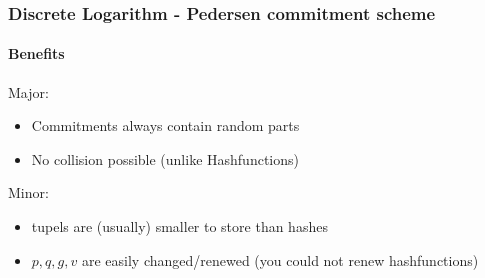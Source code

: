 \begin{frame}
	\frametitle{Discrete Logarithm - Pedersen commitment scheme}
	\framesubtitle{Benefits}
	Major:
	\begin{itemize}
		\item Commitments always contain random parts
		\item No collision possible (unlike Hashfunctions)	
	\end{itemize}
	Minor:
	\begin{itemize}
		\item tupels are (usually) smaller to store than hashes
		\item $p,q,g,v$ are easily changed/renewed (you could not renew hashfunctions)
	\end{itemize}
\end{frame}